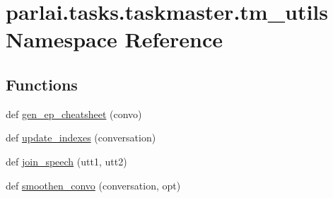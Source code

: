 \hypertarget{namespaceparlai_1_1tasks_1_1taskmaster_1_1tm__utils}{}\section{parlai.\+tasks.\+taskmaster.\+tm\+\_\+utils Namespace Reference}
\label{namespaceparlai_1_1tasks_1_1taskmaster_1_1tm__utils}
\subsection*{Functions}
\begin{DoxyCompactItemize}
\item 
def \hyperlink{namespaceparlai_1_1tasks_1_1taskmaster_1_1tm__utils_aad8e1c42802da1765887ff0407bed1b1}{gen\+\_\+ep\+\_\+cheatsheet} (convo)
\item 
def \hyperlink{namespaceparlai_1_1tasks_1_1taskmaster_1_1tm__utils_ad0c8c99eb4b5152ca8cec2a8fe7895fd}{update\+\_\+indexes} (conversation)
\item 
def \hyperlink{namespaceparlai_1_1tasks_1_1taskmaster_1_1tm__utils_ad5d13cd462bd26919f078aa93174e9cd}{join\+\_\+speech} (utt1, utt2)
\item 
def \hyperlink{namespaceparlai_1_1tasks_1_1taskmaster_1_1tm__utils_ad9cc917cf497b3cd81ccb76a719cf1b7}{smoothen\+\_\+convo} (conversation, opt)
\end{DoxyCompactItemize}
